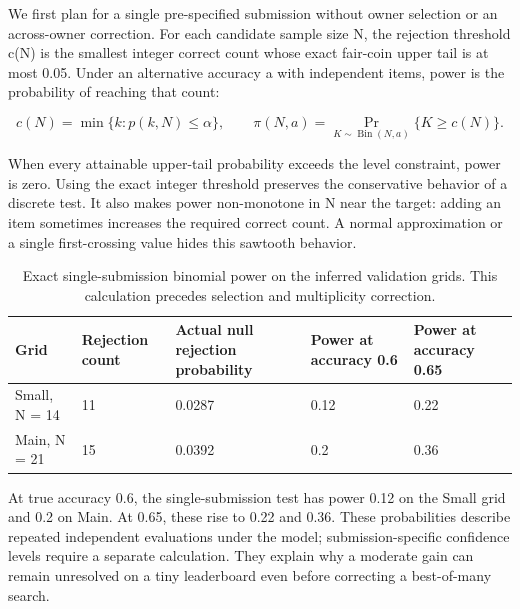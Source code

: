 We first plan for a single pre-specified submission without owner selection or an across-owner correction. For each candidate sample size N, the rejection threshold c(N) is the smallest integer correct count whose exact fair-coin upper tail is at most 0.05. Under an alternative accuracy a with independent items, power is the probability of reaching that count:


\[
c(N)=\min\{k:p(k,N)\leq\alpha\},\qquad
\pi(N,a)=\Pr_{K\sim\operatorname{Bin}(N,a)}\{K\geq c(N)\}.
\]

When every attainable upper-tail probability exceeds the level constraint, power is zero. Using the exact integer threshold preserves the conservative behavior of a discrete test. It also makes power non-monotone in N near the target: adding an item sometimes increases the required correct count. A normal approximation or a single first-crossing value hides this sawtooth behavior.


\begin{table}[htbp]

\caption{Exact single-submission binomial power on the inferred validation grids. This calculation precedes selection and multiplicity correction.}

\label{tab:2}

\small

\begin{tabularx}{\linewidth}{@{}YYYYY@{}}

\toprule

\textbf{Grid} & \textbf{Rejection count} & \textbf{Actual null rejection probability} & \textbf{Power at accuracy 0.6} & \textbf{Power at accuracy 0.65} \\

\midrule

Small, N = 14 & 11 & 0.0287 & 0.12 & 0.22 \\

Main, N = 21 & 15 & 0.0392 & 0.2 & 0.36 \\

\bottomrule

\end{tabularx}

\end{table}

At true accuracy 0.6, the single-submission test has power 0.12 on the Small grid and 0.2 on Main. At 0.65, these rise to 0.22 and 0.36. These probabilities describe repeated independent evaluations under the model; submission-specific confidence levels require a separate calculation. They explain why a moderate gain can remain unresolved on a tiny leaderboard even before correcting a best-of-many search.


